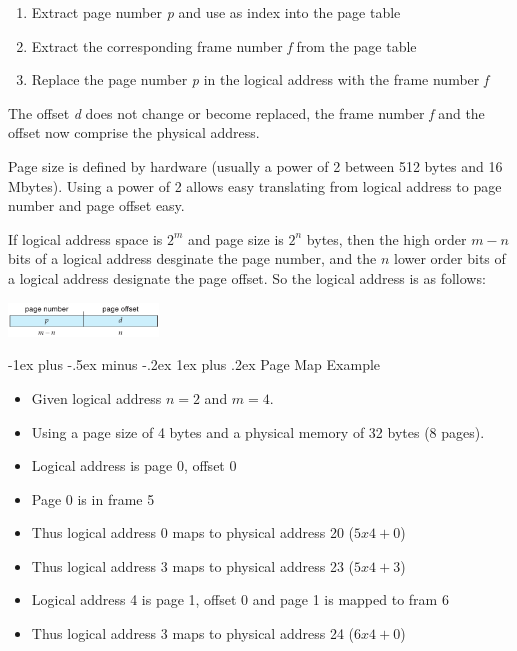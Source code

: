 \documentclass[8pt,landscape]{article}
\makeatletter
\renewcommand{\subsubsection}{\@startsection{subsubsection}{3}{0mm}%
                                {-1ex plus -.5ex minus -.2ex}%
                                {1ex plus .2ex}%
                                {\normalfont\tiny\bfseries}}
\makeatother
\begin{document}
\begin{multicols}{3}
\begin{tiny}
	\begin{enumerate}[noitemsep]
		\item Extract page number {\it p} and use as index into the page table
		\item Extract the corresponding frame number {\it f} from the page table
		\item Replace the page number {\it p} in the logical address with the frame number {\it f}
	\end{enumerate}

	The offset {\it d} does not change or become replaced, the frame number {\it f} and the offset
	now comprise the physical address.

	Page size is defined by hardware (usually a power of 2 between 512 bytes and 16 Mbytes). 
	Using a power of 2 allows easy translating from logical address to page number and page 
	offset easy.

	If logical address space is $2^m$ and page size is $2^n$ bytes, then the high order
	$m-n$ bits of a logical address desginate the page number, and the $n$ lower order bits
	of a logical address designate the page offset. So the logical address is as follows:
	
	\begingroup
		\centering
		\includegraphics[width=4cm]{pageTrans.png}
	\endgroup
	
	\subsubsection{Page Map Example}

	\begin{itemize}[noitemsep]
		\item Given logical address $n=2$ and $m=4$.
		\item Using a page size of 4 bytes and a physical memory of 32 bytes (8 pages).
		\item Logical address is page 0, offset 0
		\item Page 0 is in frame 5
		\item Thus logical address 0 maps to physical address 20 ($5x4+0$)
		\item Thus logical address 3 maps to physical address 23 ($5x4+3$)
		\item Logical address 4 is page 1, offset 0 and page 1 is mapped to fram 6
		\item Thus logical address 3 maps to physical address 24 ($6x4+0$)
	\end{itemize}


\end{tiny}
\end{multicols}
\end{document}

